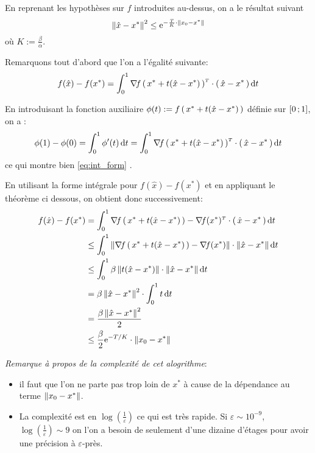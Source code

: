    \begin{theorem}
En reprenant les hypothèses sur $f$ introduites au-dessus, on a le résultat suivant
\begin{equation}
\norme{\hat{x} - x^{*}}^2 \leq \e^{-\frac{T}{K} \cdot \norme{x_0-x^{*}}}
\end{equation}
où $K := \frac{\beta}{\alpha}$.
   \end{theorem}

Remarquons tout d'abord que l'on a l'égalité suivante:
\begin{equation}
  f(\hat{x})- f(x^{*}) = \int_{0}^{1} \nabla\! f\left( \, x^{*}+t(\hat{x}-x^{*}) \, \right)^{\scriptscriptstyle T}
   \cdot \left( \, \hat{x}- x^{*} \, \right) \mathop{}\mathopen{}\mathrm{d}{}t
\end{equation}

En introduisant la fonction auxiliaire $\phi(t):= f\left( \, x^{*}+t(\hat{x}-x^{*}) \, \right)$ définie sur $\mathopen{[}0\mathpunct{};1\mathclose{]}$, on a :
\begin{equation*}\label{eq:int_form}
  \phi(1)-\phi(0)= \int_0^1 \phi^{\prime}(t) \mathop{}\mathopen{}\mathrm{d}{}t = \int_{0}^{1} \nabla\! f\left( \, x^{*}+t(\hat{x}-x^{*}) \, \right)^{\scriptscriptstyle T}
   \cdot \left( \, \hat{x}- x^{*} \, \right) \mathop{}\mathopen{}\mathrm{d}{}t
\end{equation*}
ce qui montre bien \eqref{eq:int_form} .

En utilisant la forme intégrale pour $f(\hat{x})- f(x^{*})$ et en appliquant le théorème
ci dessous, on obtient donc successivement:
\begin{align*}
f(\hat{x})- f(x^{*}) &= \int_{0}^{1} \transpose{\nabla\! f\prt{x^{*}+t(\hat{x}-x^{*})}
- \nabla\! f(x^{*})}
 \cdot \prt{\hat{x}- x^{*}} \dt\\
 &\leq \int_{0}^{1} \norme{\nabla\! f\prt{x^{*}+t(\hat{x}-x^{*})} - \nabla\! f(x^{*})}
  \cdot \norme{\hat{x}- x^{*}} \dt\\
 &\leq \int_{0}^{1} \beta \norme{t(\hat{x}-x^{*})}
  \cdot \norme{\hat{x}- x^{*}} \dt\\
 &= \beta \norme{\hat{x}- x^{*}}^2 \cdot \int_{0}^{1} t  \dt\\
 &= \frac{ \beta \norme{\hat{x}- x^{*}}^2}{2} \\
 &\leq \frac{\beta}{2} \e^{-T/K} \cdot \norme{x_0-x^{*}}
\end{align*}

\textit{Remarque à propos de la complexité de cet alogrithme}:
\begin{itemize}
  \item il faut que l'on ne parte pas trop loin de $x^{*}$ à cause de la dépendance au terme $\norme{x_0-x^{*}}$.
  \item La complexité est en $\log(\frac{1}{\varepsilon})$ ce qui est très rapide. Si $\varepsilon \sim 10^{-9}$, $\log(\frac{1}{\varepsilon}) \sim 9$ on l'on a besoin de seulement
  d'une dizaine d'étages pour avoir une précision à $\varepsilon$-près.

\end{itemize}


